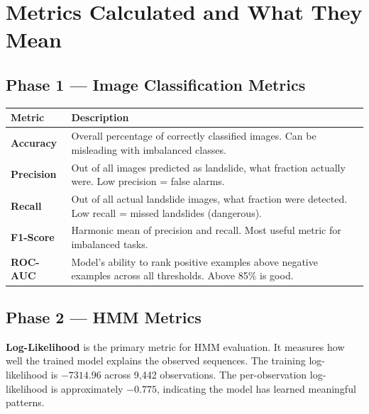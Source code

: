 \documentclass[11pt]{article}
\begin{document}
\section{Metrics Calculated and What They Mean}

\subsection{Phase 1 --- Image Classification Metrics}

\begin{table}[H]
    \centering
    \renewcommand{\arraystretch}{1.3}
    \begin{tabular}{lp{10cm}}
        \toprule
        \textbf{Metric} & \textbf{Description} \\
        \midrule
        \textbf{Accuracy} & Overall percentage of correctly classified images. Can be misleading with imbalanced classes. \\
        \textbf{Precision} & Out of all images predicted as landslide, what fraction actually were. Low precision = false alarms. \\
        \textbf{Recall} & Out of all actual landslide images, what fraction were detected. Low recall = missed landslides (dangerous). \\
        \textbf{F1-Score} & Harmonic mean of precision and recall. Most useful metric for imbalanced tasks. \\
        \textbf{ROC-AUC} & Model's ability to rank positive examples above negative examples across all thresholds. Above 85\% is good. \\
        \bottomrule
    \end{tabular}
\end{table}

\subsection{Phase 2 --- HMM Metrics}

\textbf{Log-Likelihood} is the primary metric for HMM evaluation. It measures how well the trained model explains the observed sequences. The training log-likelihood is $-7314.96$ across 9,442 observations. The per-observation log-likelihood is approximately $-0.775$, indicating the model has learned meaningful patterns.

\end{document}
